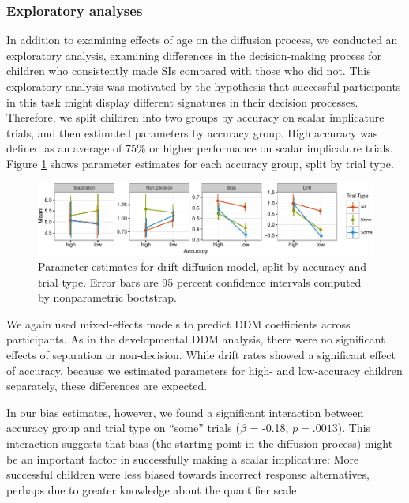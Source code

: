 \documentclass[10pt, letterpaper]{article}
\newenvironment{CodeChunk}{}{}
\begin{document}
\subsubsection{Exploratory analyses}\label{exploratory-analyses}

In addition to examining effects of age on the diffusion process, we
conducted an exploratory analysis, examining differences in the
decision-making process for children who consistently made SIs compared
with those who did not. This exploratory analysis was motivated by the
hypothesis that successful participants in this task might display
different signatures in their decision processes. Therefore, we split
children into two groups by accuracy on scalar implicature trials, and
then estimated parameters by accuracy group. High accuracy was defined
as an average of 75\% or higher performance on scalar implicature
trials. Figure \ref{fig:param_plot} shows parameter estimates for each
accuracy group, split by trial type.

\begin{CodeChunk}
\begin{figure}[!tb]

{\centering \includegraphics{figs/param_plot-1} 

}

\caption[Parameter estimates for drift diffusion model, split by accuracy and trial type]{Parameter estimates for drift diffusion model, split by accuracy and trial type. Error bars are 95 percent confidence intervals computed by nonparametric bootstrap.}\label{fig:param_plot}
\end{figure}
\end{CodeChunk}

We again used mixed-effects models to predict DDM coefficients across
participants. As in the developmental DDM analysis, there were no
significant effects of separation or non-decision. While drift rates
showed a significant effect of accuracy, because we estimated parameters
for high- and low-accuracy children separately, these differences are
expected.

In our bias estimates, however, we found a significant interaction
between accuracy group and trial type on ``some'' trials (\(\beta\) =
-0.18, \(p = .0013\)). This interaction suggests that bias (the starting
point in the diffusion process) might be an important factor in
successfully making a scalar implicature: More successful children were
less biased towards incorrect response alternatives, perhaps due to
greater knowledge about the quantifier scale.
\end{document}
